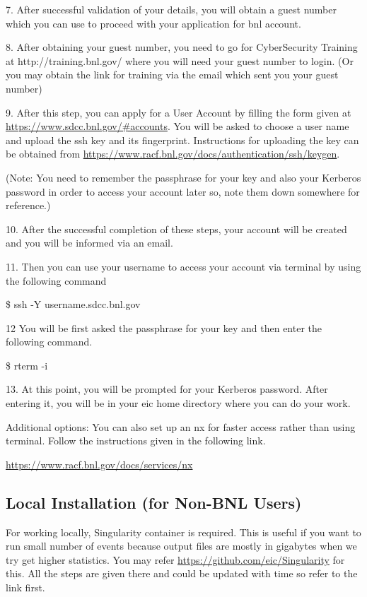 7. After successful validation of your details, you will obtain a guest number which you can use to proceed with your application for bnl account.

8. After obtaining your guest number, you need to go for CyberSecurity Training at http://training.bnl.gov/ where you will need your guest number to login. (Or you may obtain the link for training via the email which sent you your guest number)

9. After this step, you can apply for a User Account by filling the form given at \href{https://www.sdcc.bnl.gov/#accounts}{https://www.sdcc.bnl.gov/\#accounts}. You will be asked to choose a user name and upload the ssh key and its fingerprint. Instructions for uploading the key can be obtained from \href{https://www.racf.bnl.gov/docs/authentication/ssh/keygen}{https://www.racf.bnl.gov/docs/authentication/ssh/keygen}.

(Note: You need to remember the passphrase for your key and also your Kerberos password in order to access your account later so, note them down somewhere for reference.)

10. After the successful completion of these steps, your account will be created and you will be informed via an email.

11. Then you can use your username to access your account via terminal by using the following command

\$ ssh -Y username\@ssh.sdcc.bnl.gov

12 You will be first asked the passphrase for your key and then enter the following command.

\$ rterm -i

13. At this point, you will be prompted for your Kerberos password. After entering it, you will be in your eic home directory where you can do your work.

Additional options: You can also set up an nx for faster access rather than using terminal. Follow the instructions given in the following link.

\href{https://www.racf.bnl.gov/docs/services/nx}{https://www.racf.bnl.gov/docs/services/nx}




\subsection{Local Installation (for Non-BNL Users)}

For working locally, Singularity container is required. This is useful if you want to run small number of events because output files are mostly in gigabytes when we try get higher statistics. You may refer \href{https://github.com/eic/Singularity}{https://github.com/eic/Singularity}  for this. All the steps are given there and could be updated with time so refer to the link first.


